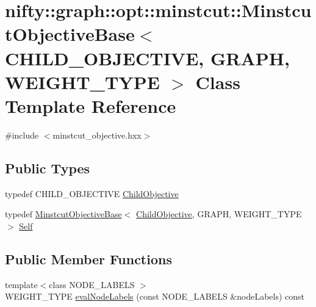 \hypertarget{classnifty_1_1graph_1_1opt_1_1minstcut_1_1MinstcutObjectiveBase}{}\section{nifty\+:\+:graph\+:\+:opt\+:\+:minstcut\+:\+:Minstcut\+Objective\+Base$<$ C\+H\+I\+L\+D\+\_\+\+O\+B\+J\+E\+C\+T\+I\+VE, G\+R\+A\+PH, W\+E\+I\+G\+H\+T\+\_\+\+T\+Y\+PE $>$ Class Template Reference}
\label{classnifty_1_1graph_1_1opt_1_1minstcut_1_1MinstcutObjectiveBase}


{\ttfamily \#include $<$minstcut\+\_\+objective.\+hxx$>$}

\subsection*{Public Types}
\begin{DoxyCompactItemize}
\item 
typedef C\+H\+I\+L\+D\+\_\+\+O\+B\+J\+E\+C\+T\+I\+VE \hyperlink{classnifty_1_1graph_1_1opt_1_1minstcut_1_1MinstcutObjectiveBase_a76bb16eab8d99a40abe6326d17bd0769}{Child\+Objective}
\item 
typedef \hyperlink{classnifty_1_1graph_1_1opt_1_1minstcut_1_1MinstcutObjectiveBase}{Minstcut\+Objective\+Base}$<$ \hyperlink{classnifty_1_1graph_1_1opt_1_1minstcut_1_1MinstcutObjectiveBase_a76bb16eab8d99a40abe6326d17bd0769}{Child\+Objective}, G\+R\+A\+PH, W\+E\+I\+G\+H\+T\+\_\+\+T\+Y\+PE $>$ \hyperlink{classnifty_1_1graph_1_1opt_1_1minstcut_1_1MinstcutObjectiveBase_a6ed9ee2c13bc67e3c6993837a30c24b9}{Self}
\end{DoxyCompactItemize}
\subsection*{Public Member Functions}
\begin{DoxyCompactItemize}
\item 
{\footnotesize template$<$class N\+O\+D\+E\+\_\+\+L\+A\+B\+E\+LS $>$ }\\W\+E\+I\+G\+H\+T\+\_\+\+T\+Y\+PE \hyperlink{classnifty_1_1graph_1_1opt_1_1minstcut_1_1MinstcutObjectiveBase_a5d1482bf80f2a2dfb416b32fa38fca5e}{eval\+Node\+Labels} (const N\+O\+D\+E\+\_\+\+L\+A\+B\+E\+LS \&node\+Labels) const
\end{DoxyCompactItemize}


